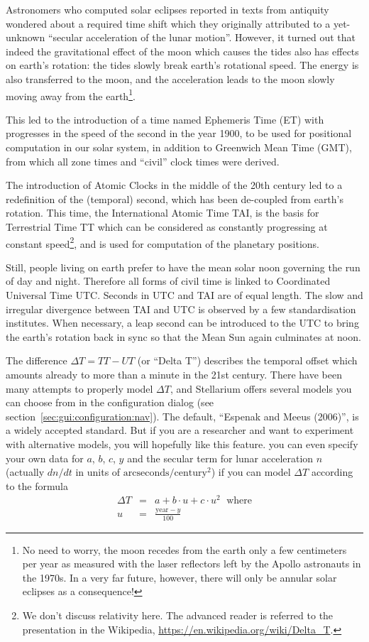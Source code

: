 Astronomers who computed solar eclipses reported in texts from
antiquity wondered about a required time shift which they originally
attributed to a yet-unknown ``secular acceleration of the lunar
motion''. However, it turned out that indeed the gravitational effect
of the moon which causes the tides also has effects on earth's
rotation: the tides slowly break earth's rotational speed. The energy
is also transferred to the moon, and the acceleration leads to the
moon slowly moving away from the earth\footnote{No need to worry, the
  moon recedes from the earth only a few centimeters per year as
  measured with the laser reflectors left by the Apollo astronauts in
  the 1970s. In a very far future, however, there will only be annular
  solar eclipses as a consequence!}.

This led to the introduction of a time named Ephemeris Time (ET) with
progresses in the speed of the second in the year 1900, to be used for
positional computation in our solar system, in addition to Greenwich
Mean Time (GMT), from which all zone times and ``civil'' clock times were
derived.

The introduction of Atomic Clocks in the middle of the 20th century
led to a redefinition of the (temporal) second, which has been
de-coupled from earth's rotation. This time, the International Atomic
Time TAI, is the basis for Terrestrial Time TT which can be
considered as constantly progressing at constant speed\footnote{We
  don't discuss relativity here. The advanced reader is referred to
  the presentation in the Wikipedia,
  \url{https://en.wikipedia.org/wiki/Delta_T}.}, and is used for
computation of the planetary positions.

Still, people living on earth prefer to have the mean solar noon
governing the run of day and night. Therefore all forms of civil time
is linked to Coordinated Universal Time UTC. Seconds in UTC and TAI
are of equal length. The slow and irregular divergence between TAI and
UTC is observed by a few standardisation institutes.  When necessary,
a leap second can be introduced to the UTC to bring the earth's
rotation back in sync so that the Mean Sun again culminates at noon.

The difference $\Delta T=TT-UT$ (or ``Delta T'') describes the
temporal offset which amounts already to more than a minute in the 21st
century. There have been many attempts to properly model $\Delta T$,
and Stellarium offers several models you can choose from in the
configuration dialog (see
section~\ref{sec:gui:configuration:nav}). The default, ``Espenak and
Meeus (2006)'', is a widely accepted standard. But if you are a
researcher and want to experiment with alternative models, you will
hopefully like this feature. you can even specify your own data for
$a$, $b$, $c$, $y$ and the secular term for lunar acceleration $n$
(actually $dn/dt$ in units of
$\mathrm{arcseconds}/\mathrm{century}^2$) if you can model $\Delta T$
according to the formula
\begin{eqnarray}
  \label{eq:DeltaT:custom}
  \Delta T &=& a+ b\cdot u + c \cdot u^2 \, \ \ \text{where}\\
         u &=& \frac{\mathrm{year}-y}{100}
\end{eqnarray}




